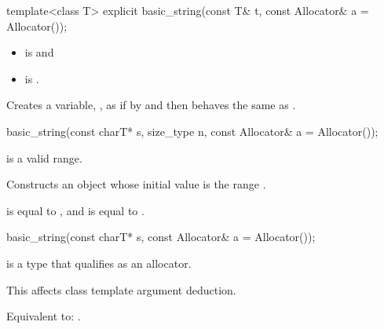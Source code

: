 %
\begin{itemdecl}
template<class T>
  explicit basic_string(const T& t, const Allocator& a = Allocator());
\end{itemdecl}

\begin{itemdescr}
\pnum
\constraints
\begin{itemize}
\item
{} is
 and
\item
{} is
.
\end{itemize}

\pnum
\effects Creates a variable, , as if by
 and
then behaves the same as .
\end{itemdescr}

%
\begin{itemdecl}
basic_string(const charT* s, size_type n, const Allocator& a = Allocator());
\end{itemdecl}

\begin{itemdescr}
\pnum
\expects {} is a valid range.

\pnum
\effects
Constructs an object whose initial value is the range .

\pnum
\ensures
{} is equal to , and
 is equal to .
\end{itemdescr}

%
\begin{itemdecl}
basic_string(const charT* s, const Allocator& a = Allocator());
\end{itemdecl}

\begin{itemdescr}
\pnum
\constraints
{} is a type
that qualifies as an allocator.
\begin{note}
This affects class template argument deduction.
\end{note}

\pnum
\effects Equivalent to: .
\end{itemdescr}

